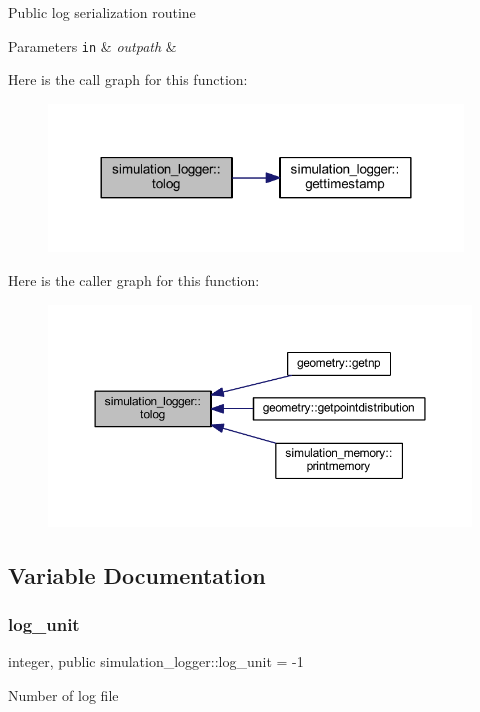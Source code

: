 Public log serialization routine 
\begin{DoxyParams}[1]{Parameters}
\mbox{\tt in}  & {\em outpath} & \\
\hline
\end{DoxyParams}
Here is the call graph for this function\+:\nopagebreak
\begin{figure}[H]
\begin{center}
\leavevmode
\includegraphics[width=312pt]{namespacesimulation__logger_a3aaa69ec168b6f34d703fb4033a22d92_cgraph}
\end{center}
\end{figure}
Here is the caller graph for this function\+:\nopagebreak
\begin{figure}[H]
\begin{center}
\leavevmode
\includegraphics[width=350pt]{namespacesimulation__logger_a3aaa69ec168b6f34d703fb4033a22d92_icgraph}
\end{center}
\end{figure}


\subsection{Variable Documentation}
\mbox{\label{namespacesimulation__logger_a9ef3d703b0c79dd563330003a82c99d9}} 
\subsubsection{\texorpdfstring{log\+\_\+unit}{log\_unit}}
{\footnotesize\ttfamily integer, public simulation\+\_\+logger\+::log\+\_\+unit = -\/1}



\textquotesingle{}Number\textquotesingle{} of log file 

